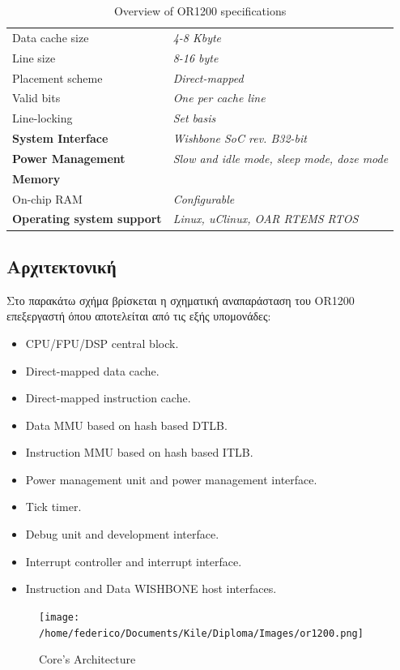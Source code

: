 \documentclass[a4paper,10pt]{article}
\numberwithin{figure}{subsection}
\numberwithin{table}{subsection}
\begin{document}
{{\begin{table}
\begin{center}
\begin{tabular}{ll}
Data cache size & \textit{4-8 Kbyte}\\
\rowcolor{tcC}
Line size & \textit{8-16 byte}\\
\rowcolor{tcD}
Placement scheme & \textit{Direct-mapped}\\
\rowcolor{tcC}
Valid bits & \textit{One per cache line}\\
\rowcolor{tcD}
Line-locking & \textit{Set basis}\\
\rowcolor{tcC}
\textbf{System Interface} & \textit{Wishbone SoC rev. B32-bit}\\
\rowcolor{tcD}
\textbf{Power Management} & \textit{Slow and idle mode, sleep mode, doze mode}\\
\rowcolor{tcC}
\textbf{Memory} &  \\
\rowcolor{tcD}
On-chip RAM & \textit{Configurable} \\
\rowcolor{tcC}
\textbf{Operating system
support} & \textit{Linux, uClinux, OAR RTEMS RTOS}\\
\end{tabular}
\end{center}
\caption{Overview of OR1200 specifications}
\end{table}
}%
\vspace{0.7cm}
\newpage


\subsection{Αρχιτεκτονική}
Στο παρακάτω σχήμα βρίσκεται η σχηματική αναπαράσταση του OR1200 επεξεργαστή όπου αποτελείται από τις εξής υπομονάδες:
\begin{itemize}
 \item CPU/FPU/DSP central block.
 \item Direct-mapped data cache.
 \item Direct-mapped instruction cache.
 \item Data MMU based on hash based DTLB.
 \item Instruction MMU based on hash based ITLB.
 \item Power management unit and power management interface.
 \item Tick timer.
 \item Debug unit and development interface.
 \item Interrupt controller and interrupt interface.
 \item Instruction and Data WISHBONE host interfaces.
\end{itemize}
\begin{figure}[h!]
 \centering
 \texttt{[image: /home/federico/Documents/Kile/Diploma/Images/or1200.png]}
 \caption{Core's Architecture}
\end{figure}

}
\end{document}
